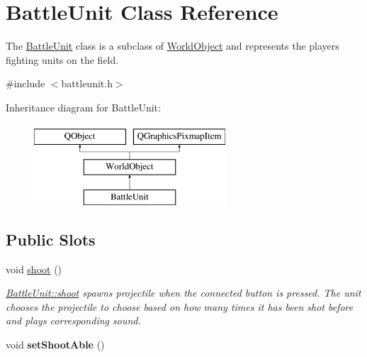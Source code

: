 \hypertarget{class_battle_unit}{}\section{Battle\+Unit Class Reference}
\label{class_battle_unit}


The \hyperlink{class_battle_unit}{Battle\+Unit} class is a subclass of \hyperlink{class_world_object}{World\+Object} and represents the player\textquotesingle{}s fighting units on the field.  




{\ttfamily \#include $<$battleunit.\+h$>$}

Inheritance diagram for Battle\+Unit\+:\begin{figure}[H]
\begin{center}
\leavevmode
\includegraphics[height=3.000000cm]{class_battle_unit}
\end{center}
\end{figure}
\subsection*{Public Slots}
\begin{DoxyCompactItemize}
\item 
void \hyperlink{class_battle_unit_ad483aca2f0e52cb79c5b0444f6fbd1da}{shoot} ()\hypertarget{class_battle_unit_ad483aca2f0e52cb79c5b0444f6fbd1da}{}\label{class_battle_unit_ad483aca2f0e52cb79c5b0444f6fbd1da}

\begin{DoxyCompactList}\small\item\em \hyperlink{class_battle_unit_ad483aca2f0e52cb79c5b0444f6fbd1da}{Battle\+Unit\+::shoot} spawns projectile when the connected button is pressed. The unit chooses the projectile to choose based on how many times it has been shot before and plays corresponding sound. \end{DoxyCompactList}\item 
void {\bfseries set\+Shoot\+Able} ()\hypertarget{class_battle_unit_a32aaaf8056f9545f231a9bdc368aef8f}{}\label{class_battle_unit_a32aaaf8056f9545f231a9bdc368aef8f}

\end{DoxyCompactItemize}
